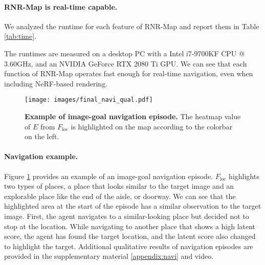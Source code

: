 \documentclass[10pt,twocolumn,letterpaper]{article}
\def\proposed{RNR-Map\xspace}
\begin{document}
\begin{table}[t]
\centering
{}
\vspace{-0.2cm}
\caption{\textbf{Runtime analysis of \proposed.}}
\vspace{-0.5cm}
\label{tab:time}
\end{table}

\paragraph{\proposed is real-time capable.}
We analyzed the runtime for each feature of \proposed and report them in Table \ref{tab:time}.

The runtimes are measured on a desktop PC with a Intel i7-9700KF CPU @ 3.60GHz, and an NVIDIA GeForce RTX 2080 Ti GPU.
We can see that each function of \proposed operates fast enough for real-time navigation, even when including NeRF-based rendering. 


\begin{figure}
  \centering
\vspace{-0.1cm}
  \texttt{[image: images/final\_navi\_qual.pdf]}
  \vspace{-0.7cm}
  \caption{\textbf{Example of image-goal navigation episode.} The heatmap value of $E$ from $F_\mathrm{loc}$ is highlighted on the map according to the colorbar on the left.}
  \vspace{-0.0cm}
\label{fig:navi_ex}

\end{figure}


\paragraph{Navigation example.}
Figure \ref{fig:navi_ex} provides an example of an image-goal navigation episode. 
%
$F_\mathrm{loc}$ highlights two types of places, a place that looks similar to the target image and an explorable place like the end of the aisle, or doorway.
%
We can see that the highlighted area at the start of the episode has a similar observation to the target image.
%
First, the agent navigates to a similar-looking place but decided not to stop at the location.
%
While navigating to another place that shows a high latent score, the agent has found the target location, and the latent score also changed to highlight the target.
%
Additional qualitative results of navigation episodes are provided in the supplementary material \ref{appendix:navi} and video.
\vspace{-0.1cm}
\end{document}
